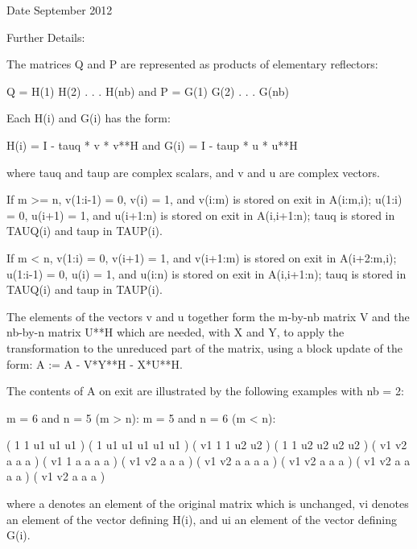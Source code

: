 \begin{DoxyDate}{Date}
September 2012 
\end{DoxyDate}
\begin{DoxyParagraph}{Further Details\+: }
\begin{DoxyVerb}  The matrices Q and P are represented as products of elementary
  reflectors:

     Q = H(1) H(2) . . . H(nb)  and  P = G(1) G(2) . . . G(nb)

  Each H(i) and G(i) has the form:

     H(i) = I - tauq * v * v**H  and G(i) = I - taup * u * u**H

  where tauq and taup are complex scalars, and v and u are complex
  vectors.

  If m >= n, v(1:i-1) = 0, v(i) = 1, and v(i:m) is stored on exit in
  A(i:m,i); u(1:i) = 0, u(i+1) = 1, and u(i+1:n) is stored on exit in
  A(i,i+1:n); tauq is stored in TAUQ(i) and taup in TAUP(i).

  If m < n, v(1:i) = 0, v(i+1) = 1, and v(i+1:m) is stored on exit in
  A(i+2:m,i); u(1:i-1) = 0, u(i) = 1, and u(i:n) is stored on exit in
  A(i,i+1:n); tauq is stored in TAUQ(i) and taup in TAUP(i).

  The elements of the vectors v and u together form the m-by-nb matrix
  V and the nb-by-n matrix U**H which are needed, with X and Y, to apply
  the transformation to the unreduced part of the matrix, using a block
  update of the form:  A := A - V*Y**H - X*U**H.

  The contents of A on exit are illustrated by the following examples
  with nb = 2:

  m = 6 and n = 5 (m > n):          m = 5 and n = 6 (m < n):

    (  1   1   u1  u1  u1 )           (  1   u1  u1  u1  u1  u1 )
    (  v1  1   1   u2  u2 )           (  1   1   u2  u2  u2  u2 )
    (  v1  v2  a   a   a  )           (  v1  1   a   a   a   a  )
    (  v1  v2  a   a   a  )           (  v1  v2  a   a   a   a  )
    (  v1  v2  a   a   a  )           (  v1  v2  a   a   a   a  )
    (  v1  v2  a   a   a  )

  where a denotes an element of the original matrix which is unchanged,
  vi denotes an element of the vector defining H(i), and ui an element
  of the vector defining G(i).\end{DoxyVerb}
 
\end{DoxyParagraph}
